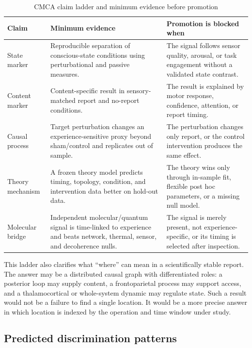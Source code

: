 \documentclass[conference]{IEEEtran}
\begin{document}
\begin{table}[t]
\caption{CMCA claim ladder and minimum evidence before promotion}
\label{tab:claimladder}
\centering
\footnotesize
\begin{tabular}{p{} p{} p{}}
\toprule
\textbf{Claim} & \textbf{Minimum evidence} & \textbf{Promotion is blocked when}\\
\midrule
State marker & Reproducible separation of conscious-state conditions using perturbational and passive measures. & The signal follows sensor quality, arousal, or task engagement without a validated state contrast.\\
Content marker & Content-specific result in sensory-matched report and no-report conditions. & The result is explained by motor response, confidence, attention, or report timing.\\
Causal process & Target perturbation changes an experience-sensitive proxy beyond sham/control and replicates out of sample. & The perturbation changes only report, or the control intervention produces the same effect.\\
Theory mechanism & A frozen theory model predicts timing, topology, condition, and intervention data better on hold-out data. & The theory wins only through in-sample fit, flexible post hoc parameters, or a missing null model.\\
Molecular bridge & Independent molecular/quantum signal is time-linked to experience and beats network, thermal, sensor, and decoherence nulls. & The signal is merely present, not experience-specific, or its timing is selected after inspection.\\
\bottomrule
\end{tabular}
\end{table}

This ladder also clarifies what ``where'' can mean in a scientifically stable report. The answer may be a distributed causal graph with differentiated roles: a posterior loop may supply content, a frontoparietal process may support access, and a thalamocortical or whole-system dynamic may regulate state. Such a result would not be a failure to find a single location. It would be a more precise answer in which location is indexed by the operation and time window under study.

\subsection{Predicted discrimination patterns}
\end{document}

